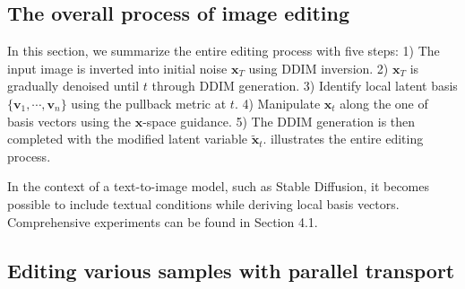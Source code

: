\subsection{The overall process of image editing}
In this section, we summarize the entire editing process with five steps: 1) The input image is inverted into initial noise $\mathbf{x}_T$ using DDIM inversion. 2) $\mathbf{x}_T$ is gradually denoised until $t$ through DDIM generation. 3) Identify local latent basis $\{ \mathbf{v}_1, \cdots, \mathbf{v}_n \}$ using the pullback metric at $t$. 4) Manipulate $\mathbf{x}_t$ along the one of basis vectors using the $\mathbf{x}$-space guidance. 5) The DDIM generation is then completed with the modified latent variable $\tilde{\mathbf{x}}_t$.  illustrates the entire editing process. 

In the context of a text-to-image model, such as Stable Diffusion, it becomes possible to include textual conditions while deriving local basis vectors. 
Comprehensive experiments can be found in Section 4.1.




\subsection{{Editing various samples with parallel transport}}


